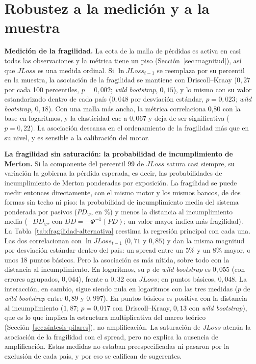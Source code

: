\section{Robustez a la medición y a la muestra}
\label{sec:robustez}

\textbf{Medición de la fragilidad.} La cota de la malla de pérdidas es activa en casi todas las observaciones y la métrica tiene un piso (Sección~\ref{sec:magnitud}), así que $JLoss$ es una medida ordinal. Si $\ln JLoss_{t-1}$ se reemplaza por su percentil en la muestra, la asociación de la fragilidad se mantiene con Driscoll--Kraay ($0{,}27$ por cada 100 percentiles, $p=0{,}002$; \textit{wild bootstrap}, $0{,}15$), y lo mismo con su valor estandarizado dentro de cada país ($0{,}048$ por desviación estándar, $p=0{,}023$; \textit{wild bootstrap}, $0{,}18$). Con una malla más ancha, la métrica correlaciona 0,80 con la base en logaritmos, y la elasticidad cae a $0{,}067$ y deja de ser significativa ($p=0{,}22$). La asociación descansa en el ordenamiento de la fragilidad más que en su nivel, y es sensible a la calibración del motor.

\textbf{La fragilidad sin saturación: la probabilidad de incumplimiento de Merton.} Si la componente del percentil 99 de $JLoss$ satura casi siempre, su variación la gobierna la pérdida esperada, es decir, las probabilidades de incumplimiento de Merton ponderadas por exposición. La fragilidad se puede medir entonces directamente, con el mismo motor y los mismos bancos, de dos formas sin techo ni piso: la probabilidad de incumplimiento media del sistema ponderada por pasivos ($PD_w$, en \%) y menos la distancia al incumplimiento media ($-DD_w$, con $DD=-\Phi^{-1}(PD)$; un valor mayor indica más fragilidad). La Tabla~\ref{tab:fragilidad-alternativa} reestima la regresión principal con cada una. Las dos correlacionan con $\ln JLoss_{t-1}$ ($0{,}71$ y $0{,}85$) y dan la misma magnitud por desviación estándar dentro del país: un spread entre un 5\% y un 8\% mayor, o unos 18 puntos básicos. Pero la asociación es más nítida, sobre todo con la distancia al incumplimiento. En logaritmos, su $p$ de \textit{wild bootstrap} es $0{,}055$ (con errores agrupados, $0{,}044$), frente a $0{,}32$ con $JLoss$; en puntos básicos, $0{,}048$. La interacción, en cambio, sigue siendo nula en logaritmos con las tres medidas ($p$ de \textit{wild bootstrap} entre $0{,}89$ y $0{,}997$). En puntos básicos es positiva con la distancia al incumplimiento ($1{,}87$; $p=0{,}017$ con Driscoll--Kraay, $0{,}13$ con \textit{wild bootstrap}), que es lo que implica la estructura multiplicativa del marco teórico (Sección~\ref{sec:sintesis-pilares}), no amplificación. La saturación de $JLoss$ atenúa la asociación de la fragilidad con el spread, pero no explica la ausencia de amplificación. Estas medidas no estaban preespecificadas ni pasaron por la exclusión de cada país, y por eso se califican de sugerentes.


